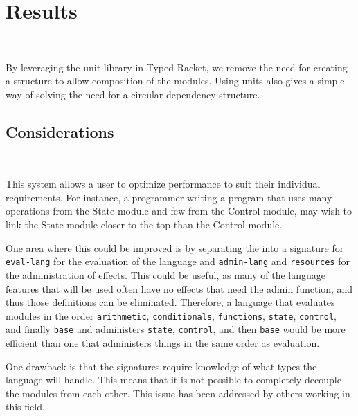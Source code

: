
\section{Results}
~

By leveraging the unit library in Typed Racket, we remove the need for creating a structure to allow composition of the modules. Using units also gives a simple way of solving the need for a circular  dependency structure.

\subsection{Considerations}
~

This system allows a user to optimize performance to suit their individual requirements. For instance, a programmer writing a program that uses many operations from the State module and few from the Control module, may wish to link the State module closer to the top than the Control module.

One area where this could be improved is by separating the \langSig into a signature for \verb#eval-lang# for the evaluation of the language and \verb#admin-lang# and \verb#resources# for the administration of effects. This could be useful, as many of the language features that will be used often have no effects that need the admin function, and thus those definitions can be eliminated. Therefore, a language that evaluates modules in the order \verb#arithmetic#, \verb#conditionals#, \verb#functions#, \verb#state#, \verb#control#, and finally \verb#base# and administers \verb#state#, \verb#control#, and then \verb#base# would be more efficient than one that administers things in the same order as evaluation.

One drawback is that the signatures require knowledge of what types the language will handle. This means that it is not possible to completely decouple the modules from each other. This issue has been addressed by others working in this field\cite{effects}.